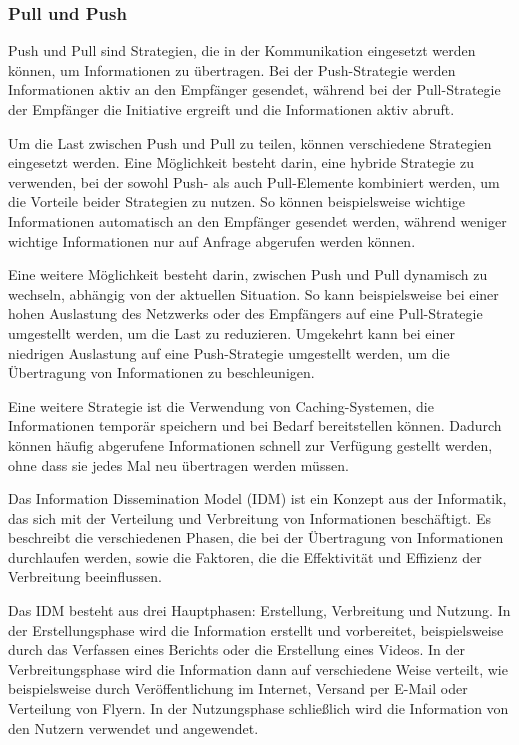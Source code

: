 \subsubsection{Pull und Push}

Push und Pull sind Strategien, die in der Kommunikation eingesetzt werden können, um Informationen zu übertragen. Bei der Push-Strategie werden Informationen aktiv an den Empfänger gesendet, während bei der Pull-Strategie der Empfänger die Initiative ergreift und die Informationen aktiv abruft.

Um die Last zwischen Push und Pull zu teilen, können verschiedene Strategien eingesetzt werden. Eine Möglichkeit besteht darin, eine hybride Strategie zu verwenden, bei der sowohl Push- als auch Pull-Elemente kombiniert werden, um die Vorteile beider Strategien zu nutzen. So können beispielsweise wichtige Informationen automatisch an den Empfänger gesendet werden, während weniger wichtige Informationen nur auf Anfrage abgerufen werden können.

Eine weitere Möglichkeit besteht darin, zwischen Push und Pull dynamisch zu wechseln, abhängig von der aktuellen Situation. So kann beispielsweise bei einer hohen Auslastung des Netzwerks oder des Empfängers auf eine Pull-Strategie umgestellt werden, um die Last zu reduzieren. Umgekehrt kann bei einer niedrigen Auslastung auf eine Push-Strategie umgestellt werden, um die Übertragung von Informationen zu beschleunigen.

Eine weitere Strategie ist die Verwendung von Caching-Systemen, die Informationen temporär speichern und bei Bedarf bereitstellen können. Dadurch können häufig abgerufene Informationen schnell zur Verfügung gestellt werden, ohne dass sie jedes Mal neu übertragen werden müssen.

Das Information Dissemination Model (IDM) ist ein Konzept aus der Informatik, das sich mit der Verteilung und Verbreitung von Informationen beschäftigt. Es beschreibt die verschiedenen Phasen, die bei der Übertragung von Informationen durchlaufen werden, sowie die Faktoren, die die Effektivität und Effizienz der Verbreitung beeinflussen.

Das IDM besteht aus drei Hauptphasen: Erstellung, Verbreitung und Nutzung. In der Erstellungsphase wird die Information erstellt und vorbereitet, beispielsweise durch das Verfassen eines Berichts oder die Erstellung eines Videos. In der Verbreitungsphase wird die Information dann auf verschiedene Weise verteilt, wie beispielsweise durch Veröffentlichung im Internet, Versand per E-Mail oder Verteilung von Flyern. In der Nutzungsphase schließlich wird die Information von den Nutzern verwendet und angewendet.

